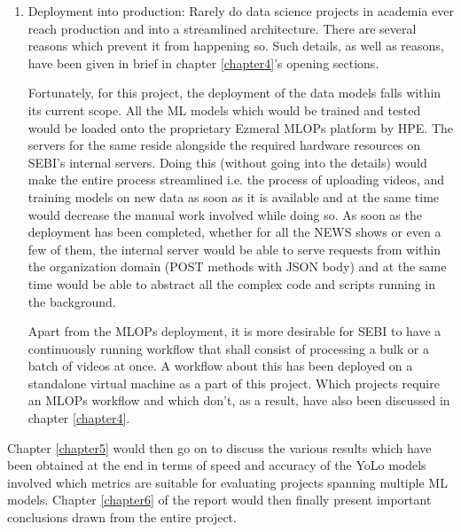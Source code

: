 \begin{enumerate}
  \item Deployment into production: Rarely do data science projects in academia ever reach production and into a streamlined architecture. There are several reasons which prevent it from happening so. Such details, as well as reasons, have been given in brief in chapter \ref{chapter4}’s opening sections. \par
   Fortunately, for this project, the deployment of the data models falls within its current scope. All the ML models which would be trained and tested would be loaded onto the proprietary Ezmeral MLOPs platform by HPE. The servers for the same reside alongside the required hardware resources on SEBI’s internal servers. Doing this (without going into the details) would make the entire process streamlined i.e. the process of uploading videos, and training models on new data as soon as it is available and at the same time would decrease the manual work involved while doing so. As soon as the deployment has been completed, whether for all the NEWS shows or even a few of them, the internal server would be able to serve requests from within the organization domain (POST methods with JSON body) and at the same time would be able to abstract all the complex code and scripts running in the background. \par

   Apart from the MLOPs deployment, it is more desirable for SEBI to have a continuously running workflow that shall consist of processing a bulk or a batch of videos at once. A workflow about this has been deployed on a standalone virtual machine as a part of this project. Which projects require an MLOPs workflow and which don’t, as a result, have also been discussed in chapter \ref{chapter4}.
\end{enumerate}


Chapter \ref{chapter5} would then go on to discuss the various results which have been obtained at the end in terms of speed and accuracy of the YoLo models involved which metrics are suitable for evaluating projects spanning multiple ML models. Chapter \ref{chapter6} of the report would then finally present important conclusions drawn from the entire project.
